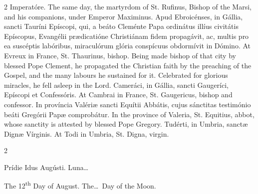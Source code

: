 \begin{paracol}{2}
 Imperatóre.
\switchcolumn
{}
The same day, the martyrdom of St. 
 Rufinus, Bishop of the Marsi, and his companions, under Emperor Maximinus.
\switchcolumn*
{}
Apud Ebroicénses, in 
 Gállia, sancti Tauríni Epíscopi, qui, a beáto Cleménte Papa ordinátus illíus 
 civitátis Epíscopus, Evangélii prædicatióne Christiánam fidem propagávit, 
 ac, multis pro ea suscéptis labóribus, miraculórum glória conspícuus 
 obdormívit in Dómino.
\switchcolumn
{}
At Evreux in France, St. Thaurinus, 
 bishop. Being made bishop of that city by blessed Pope Clement, he 
 propagated the Christian faith by the preaching of the Gospel, and the many 
 labours he sustained for it. Celebrated for glorious miracles, he fell 
 asleep in the Lord.
\switchcolumn*
{}
Cameráci, in Gállia, 
 sancti Gaugeríci, Epíscopi et Confessóris.
\switchcolumn
{}
At Cambrai in France, St. Gaugericus, 
 bishop and confessor.
\switchcolumn*
{}
In província Valériæ 
 sancti Equítii Abbátis, cujus sánctitas testimónio beáti Gregórii Papæ 
 comprobátur.
\switchcolumn
{}
In the province of Valeria, St. 
 Equitius, abbot, whose sanctity is attested by blessed Pope Gregory.
\switchcolumn*
{}
Tudérti, in Umbria, 
 sanctæ Dignæ Vírginis.
\switchcolumn
{}
At Todi in Umbria, St. Digna, 
 virgin.
\switchcolumn*
{}
\end{paracol}


\begin{paracol}{2}
\begin{center}{\color{gregoriocolor} Prídie Idus Augústi. 
 Luna\dots\ }\end{center}
\switchcolumn
{}
\begin{center}{\color{gregoriocolor} The 12\textsuperscript{th} Day of 
 August. The\dots\ Day of the Moon.}\end{center}
\end{paracol}

